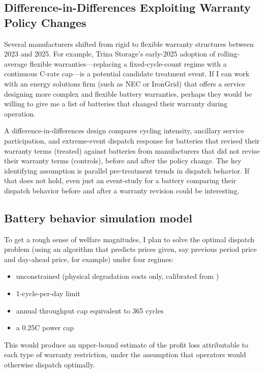 \documentclass[12pt]{article}
\begin{document}
\subsection{Difference-in-Differences Exploiting Warranty Policy Changes}

Several manufacturers shifted from rigid to flexible warranty structures between 2023 and 2025. For example, Trina Storage's early-2025 adoption of rolling-average flexible warranties---replacing a fixed-cycle-count regime with a continuous C-rate cap---is a potential candidate treatment event. If I can work with an energy solutions firm (such as NEC or IronGrid) that offers a service designing more complex and flexible battery warranties, perhaps they would be willing to give me a list of batteries that changed their warranty during operation.

A difference-in-differences design compares cycling intensity, ancillary service participation, and extreme-event dispatch response for batteries that revised their warranty terms (treated) against batteries from manufacturers that did not revise their warranty terms (controls), before and after the policy change. The key identifying assumption is parallel pre-treatment trends in dispatch behavior. If that does not hold, even just an event-study for a battery comparing their dispatch behavior before and after a warranty revision could be interesting.

\subsection{Battery behavior simulation model}
To get a rough sense of welfare magnitudes, I plan to solve the optimal dispatch problem (using an algorithm that predicts prices given, say previous period price and day-ahead price, for example) under four regimes: 
\begin{itemize}
    \item unconstrained (physical degradation costs only, calibrated from \citealt{xu2018})
    \item 1-cycle-per-day limit
    \item annual throughput cap equivalent to 365 cycles
    \item a 0.25C power cap
\end{itemize}

This would produce an upper-bound estimate of the profit loss attributable to each type of warranty restriction, under the assumption that operators would otherwise dispatch optimally. 
\end{document}

